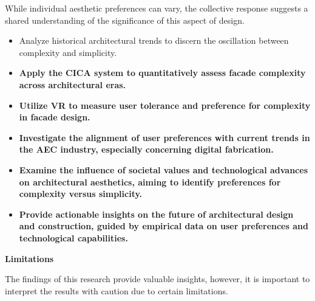 
While individual aesthetic preferences can vary, the collective response suggests a shared understanding of the significance of this aspect of design.




\begin{itemize}
    \item Analyze historical architectural trends to discern the oscillation between complexity and simplicity.
    \item \textbf{Apply the CICA system to quantitatively assess facade complexity across architectural eras.}
    \item \textbf{Utilize VR to measure user tolerance and preference for complexity in facade design.}
    \item \textbf{Investigate the alignment of user preferences with current trends in the AEC industry, especially concerning digital fabrication.}
    \item \textbf{Examine the influence of societal values and technological advances on architectural aesthetics, aiming to identify preferences for complexity versus simplicity.}
    \item \textbf{Provide actionable insights on the future of architectural design and construction, guided by empirical data on user preferences and technological capabilities.}
\end{itemize}



\textbf{Limitations}

The findings of this research provide valuable insights, however, it is important to interpret the results with caution due to certain limitations.

